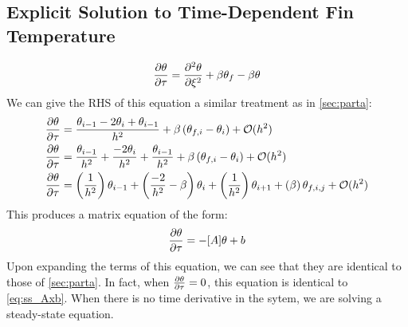 \documentclass[10pt,letterpaper,notitlepage]{article}
\begin{document}
    \subsection{Explicit Solution to Time-Dependent Fin Temperature}
    \label{sec:explicit_time_rk2}
    \begin{equation}
        \pdv{\theta}{\tau} = \pdv[2]{\theta}{\xi} + \beta \theta_f - \beta \theta
        \label{eq:governing_time}
    \end{equation}
    We can give the RHS of this equation a similar treatment as in \cref{sec:parta}:
    \begin{align}
        \pdv{\theta}{\tau} &= \frac{\theta_{i-1} -2 \theta_i + \theta_{i-1}}{h^2}+ \beta \left(\theta_{f,i} - \theta_i \right) + \mathcal{O}(h^2) \\
        \pdv{\theta}{\tau} &= \frac{\theta_{i-1}}{h^2} + \frac{-2 \theta_i}{h^2} + \frac{\theta_{i-1}}{h^2}+ \beta \left(\theta_{f,i} - \theta_i \right) + \mathcal{O}(h^2) \\
        \pdv{\theta}{\tau} &= 
        \left(\frac{1}{h^2}\right) \theta_{i-1} + 
        \left(\frac{-2}{h^2} - \beta \right) \theta_i +
        \left(\frac{1}{h^2}\right) \theta_{i+1} + 
        \left(\beta\right) \theta_{f,i,j} + 
        \mathcal{O}(h^2)
        \label{eq:explicit_time}
    \end{align}
    This produces a matrix equation of the form:
    \begin{equation}
        \pdv{\theta}{\tau} = -[A] \theta + b 
    \end{equation}
    Upon expanding the terms of this equation, we can see that they are identical to those of \cref{sec:parta}. In fact, when $\pdv{\theta}{\tau} = 0$, this equation is identical to \cref{eq:ss_Axb}. When there is no time derivative in the sytem, we are solving a steady-state equation.
\end{document}
